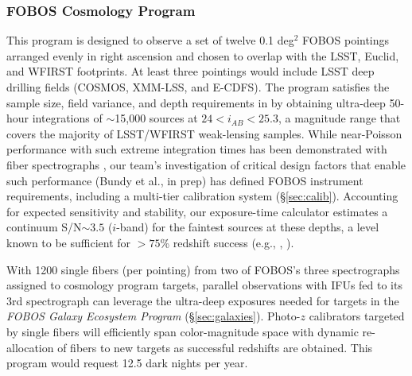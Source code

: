 \documentclass[oneside,11pt]{amsart}
\begin{document}
\subsubsection{FOBOS Cosmology Program}
This program is designed to observe a set of twelve 0.1 deg$^2$ FOBOS pointings arranged evenly in right ascension and chosen to overlap with the LSST, Euclid, and WFIRST footprints.  At least three pointings would include LSST deep drilling fields (COSMOS, XMM-LSS, and E-CDFS).  The program satisfies the sample size, field variance, and depth requirements in \citet{newman15} by obtaining ultra-deep 50-hour integrations of $\sim$15,000 sources at $24 < i_{AB} < 25.3$, a magnitude range that covers the majority of LSST/WFIRST weak-lensing samples.  While near-Poisson performance with such extreme integration times has been demonstrated with fiber spectrographs \citep[e.g.,][]{gu17,childress17}, our team's investigation of critical design factors that enable such performance (Bundy et al., in prep) has defined FOBOS instrument requirements, including a multi-tier calibration system (\S \ref{sec:calib}).  Accounting for expected sensitivity and stability, our exposure-time calculator estimates a continuum S/N$\sim3.5$ ($i$-band) for the faintest sources at these depths, a level known to be sufficient for $>75$\% redshift success (e.g., \citealp{Newman13}, \citealp{masters19}). 

With 1200 single fibers (per pointing) from two of FOBOS's three spectrographs assigned to cosmology program targets, parallel observations with IFUs fed to its 3rd spectrograph can leverage the ultra-deep exposures needed for targets in the {\it FOBOS Galaxy Ecosystem Program} (\S \ref{sec:galaxies}).  Photo-$z$ calibrators targeted by single fibers will efficiently span color-magnitude space \citep{masters15, masters19} with dynamic re-allocation of fibers to new targets as successful redshifts are obtained.  This program would request 12.5 dark nights per year.

  
\end{document}
